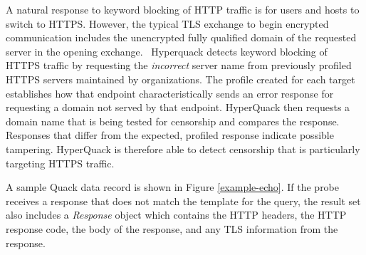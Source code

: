 A natural response to keyword blocking of HTTP traffic is for users and hosts
to switch to HTTPS. However, the typical TLS exchange to begin encrypted
communication includes the unencrypted fully qualified domain of the requested
server in the opening exchange.~\cite{blake-wilson_transport_2006} Hyperquack
detects keyword blocking of HTTPS traffic by requesting the \textit{incorrect}
server name from previously profiled HTTPS servers maintained by organizations.
The profile created for each target establishes how that endpoint
characteristically sends an error response for requesting a domain not served
by that endpoint.  HyperQuack then requests a domain name that is being tested
for censorship and compares the response.  Responses that differ from the
expected, profiled response indicate possible tampering.  HyperQuack is
therefore able to detect censorship that is particularly targeting HTTPS
traffic.

A sample Quack data record is shown in Figure \ref{example-echo}.  If the probe
receives a response that does not match the template for the query, the result
set also includes a \textit{Response} object which contains the HTTP headers,
the HTTP response code, the body of the response, and any TLS information from
the response.


